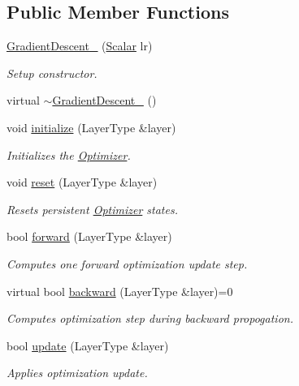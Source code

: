 \subsection*{Public Member Functions}
\begin{DoxyCompactItemize}
\item 
\hyperlink{classffnn_1_1optimizer_1_1_gradient_descent___ae6b884c98e7e5eadaac0f7c88d5a2cc1}{Gradient\-Descent\-\_\-} (\hyperlink{classffnn_1_1optimizer_1_1_gradient_descent___a9ea42179033176eb7686e00769034c8a}{Scalar} lr)
\begin{DoxyCompactList}\small\item\em Setup constructor. \end{DoxyCompactList}\item 
virtual \hyperlink{classffnn_1_1optimizer_1_1_gradient_descent___a56014df7a5afe715fb041bb0d629f15a}{$\sim$\-Gradient\-Descent\-\_\-} ()
\item 
void \hyperlink{classffnn_1_1optimizer_1_1_gradient_descent___a9b2a8f8c1a1411ffb3b2d207c42fca9e}{initialize} (Layer\-Type \&layer)
\begin{DoxyCompactList}\small\item\em Initializes the \hyperlink{classffnn_1_1optimizer_1_1_optimizer}{Optimizer}. \end{DoxyCompactList}\item 
void \hyperlink{classffnn_1_1optimizer_1_1_gradient_descent___a50581919467a4bb592eeb7fa98cd3b34}{reset} (Layer\-Type \&layer)
\begin{DoxyCompactList}\small\item\em Resets persistent \hyperlink{classffnn_1_1optimizer_1_1_optimizer}{Optimizer} states. \end{DoxyCompactList}\item 
bool \hyperlink{classffnn_1_1optimizer_1_1_gradient_descent___a3fda5e93b5fc359c4e36fc1c681e6929}{forward} (Layer\-Type \&layer)
\begin{DoxyCompactList}\small\item\em Computes one forward optimization update step. \end{DoxyCompactList}\item 
virtual bool \hyperlink{classffnn_1_1optimizer_1_1_gradient_descent___a810bd29432c41b39239337139b7a0a0b}{backward} (Layer\-Type \&layer)=0
\begin{DoxyCompactList}\small\item\em Computes optimization step during backward propogation. \end{DoxyCompactList}\item 
bool \hyperlink{classffnn_1_1optimizer_1_1_gradient_descent___a90fface371af7bef89880d278a9b2007}{update} (Layer\-Type \&layer)
\begin{DoxyCompactList}\small\item\em Applies optimization update. \end{DoxyCompactList}\end{DoxyCompactItemize}
